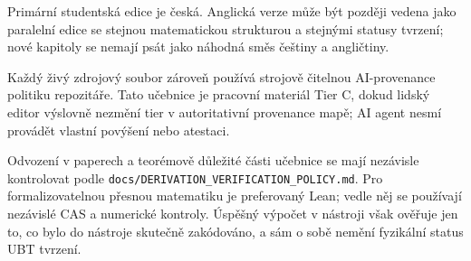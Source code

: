 Primární studentská edice je česká. Anglická verze může být později vedena jako
paralelní edice se stejnou matematickou strukturou a stejnými statusy tvrzení;
nové kapitoly se nemají psát jako náhodná směs češtiny a angličtiny.

Každý živý zdrojový soubor zároveň používá strojově čitelnou AI-provenance
politiku repozitáře. Tato učebnice je pracovní materiál Tier C, dokud lidský
editor výslovně nezmění tier v autoritativní provenance mapě; AI agent nesmí
provádět vlastní povýšení nebo atestaci.

Odvození v paperech a teorémově důležité části učebnice se mají nezávisle
kontrolovat podle \texttt{docs/DERIVATION\_VERIFICATION\_POLICY.md}. Pro
formalizovatelnou přesnou matematiku je preferovaný Lean; vedle něj se používají
nezávislé CAS a numerické kontroly. Úspěšný výpočet v nástroji však ověřuje jen
to, co bylo do nástroje skutečně zakódováno, a sám o sobě nemění fyzikální
status UBT tvrzení.
